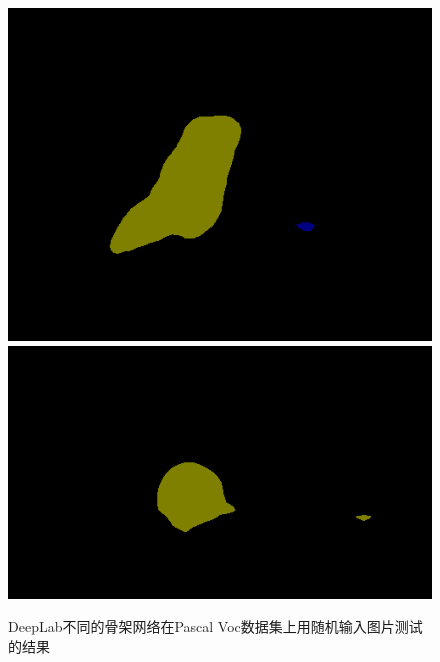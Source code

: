 \documentclass[10pt, a4paper]{article}
\begin{document}
\begin{figure}[h]
\begin{minipage}[b]{0.8\linewidth}
{\begin{minipage}[b]{0.31\linewidth}
        \includegraphics[width=\linewidth]{imgs/r101-2009_003399.png}\vspace{0pt}
        \includegraphics[width=\linewidth]{imgs/r101-2009_004375.png}
      \end{minipage}
    }
    \end{minipage}
    \vfill
    \caption{DeepLab不同的骨架网络在Pascal Voc数据集上用随机输入图片测试的结果}
    \label{p9}
\end{figure}
\end{document}
